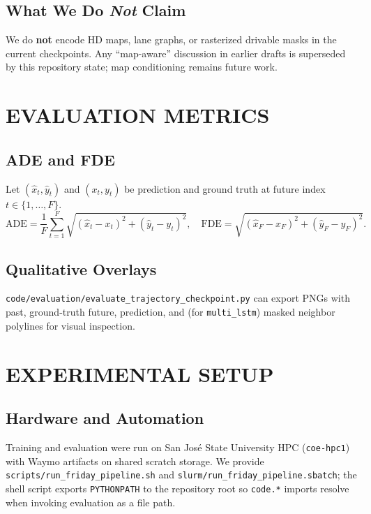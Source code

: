 \documentclass[letterpaper, 10 pt, conference]{ieeeconf}
\begin{document}
\subsection{What We Do \emph{Not} Claim}

We do \textbf{not} encode HD maps, lane graphs, or rasterized drivable masks in the current checkpoints. Any ``map-aware'' discussion in earlier drafts is superseded by this repository state; map conditioning remains future work.

\section{EVALUATION METRICS}

\subsection{ADE and FDE}

Let $(\hat{x}_t, \hat{y}_t)$ and $(x_t, y_t)$ be prediction and ground truth at future index $t \in \{1,\ldots,F\}$.
\[
\mathrm{ADE} = \frac{1}{F} \sum_{t=1}^{F} \sqrt{(\hat{x}_t - x_t)^2 + (\hat{y}_t - y_t)^2}, \quad
\mathrm{FDE} = \sqrt{(\hat{x}_F - x_F)^2 + (\hat{y}_F - y_F)^2}.
\]

\subsection{Qualitative Overlays}

\texttt{code/evaluation/evaluate\_trajectory\_checkpoint.py} can export PNGs with past, ground-truth future, prediction, and (for \texttt{multi\_lstm}) masked neighbor polylines for visual inspection.

\section{EXPERIMENTAL SETUP}

\subsection{Hardware and Automation}

Training and evaluation were run on San Jos\'{e} State University HPC (\texttt{coe-hpc1}) with Waymo artifacts on shared scratch storage. We provide \texttt{scripts/run\_friday\_pipeline.sh} and \texttt{slurm/run\_friday\_pipeline.sbatch}; the shell script exports \texttt{PYTHONPATH} to the repository root so \texttt{code.*} imports resolve when invoking evaluation as a file path.
\end{document}

